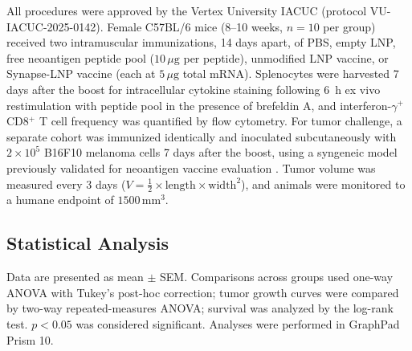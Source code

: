 All procedures were approved by the Vertex University IACUC (protocol VU-IACUC-2025-0142). Female C57BL/6 mice (8--10 weeks, $n = 10$ per group) received two intramuscular immunizations, 14 days apart, of PBS, empty LNP, free neoantigen peptide pool ($10\,\mu\text{g}$ per peptide), unmodified LNP vaccine, or Synapse-LNP vaccine (each at $5\,\mu\text{g}$ total mRNA). Splenocytes were harvested 7 days after the boost for intracellular cytokine staining following 6~h ex vivo restimulation with peptide pool in the presence of brefeldin A, and interferon-$\gamma^{+}$ CD8$^{+}$ T cell frequency was quantified by flow cytometry. For tumor challenge, a separate cohort was immunized identically and inoculated subcutaneously with $2\times10^{5}$ B16F10 melanoma cells 7 days after the boost, using a syngeneic model previously validated for neoantigen vaccine evaluation \citep{Whitfield2022}. Tumor volume was measured every 3 days ($V = \tfrac{1}{2} \times \text{length} \times \text{width}^{2}$), and animals were monitored to a humane endpoint of $1500\,\text{mm}^{3}$.

\subsection{Statistical Analysis}

Data are presented as mean $\pm$ SEM. Comparisons across groups used one-way ANOVA with Tukey's post-hoc correction; tumor growth curves were compared by two-way repeated-measures ANOVA; survival was analyzed by the log-rank test. $p < 0.05$ was considered significant. Analyses were performed in GraphPad Prism 10.

